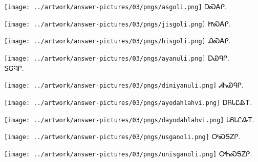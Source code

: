 \documentclass[avery5371,frame]{flashcards}%
\begin{document}
\begin{flashcard}{
\texttt{[image: ../artwork/answer-pictures/03/pngs/asgoli.png]}
}\Huge ᎠᏍᎪᎵ.
\end{flashcard}

\begin{flashcard}{
\texttt{[image: ../artwork/answer-pictures/03/pngs/jisgoli.png]}
}\Huge ᏥᏍᎪᎵ.
\end{flashcard}

\begin{flashcard}{
\texttt{[image: ../artwork/answer-pictures/03/pngs/hisgoli.png]}
}\Huge ᎯᏍᎪᎵ.
\end{flashcard}

\begin{flashcard}{
\texttt{[image: ../artwork/answer-pictures/03/pngs/ayanuli.png]}
}\Huge ᎠᏯᏄᎵ.\\ᎦᏣᏄᎵ.
\end{flashcard}

\begin{flashcard}{
\texttt{[image: ../artwork/answer-pictures/03/pngs/diniyanuli.png]}
}\Huge ᏗᏂᏯᏄᎵ.
\end{flashcard}

\begin{flashcard}{
\texttt{[image: ../artwork/answer-pictures/03/pngs/ayodahlahvi.png]}
}\Huge ᎠᏲᏓᏝᎲᎢ.
\end{flashcard}

\begin{flashcard}{
\texttt{[image: ../artwork/answer-pictures/03/pngs/dayodahlahvi.png]}
}\Huge ᏓᏲᏓᏝᎲᎢ.
\end{flashcard}

\begin{flashcard}{
\texttt{[image: ../artwork/answer-pictures/03/pngs/usganoli.png]}
}\Huge ᎤᏍᎦᏃᎵ.
\end{flashcard}

\begin{flashcard}{
\texttt{[image: ../artwork/answer-pictures/03/pngs/unisganoli.png]}
}\Huge ᎤᏂᏍᎦᏃᎵ.
\end{flashcard}
\end{document}
